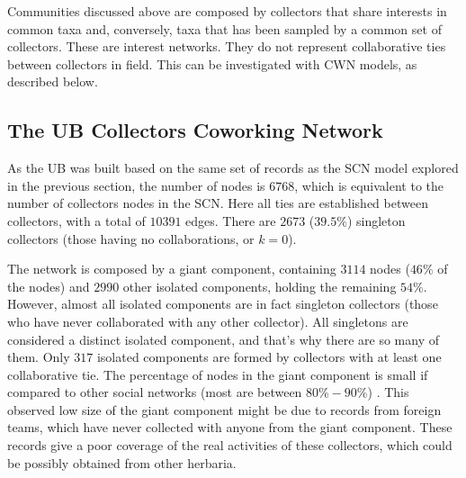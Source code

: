Communities discussed above are composed by collectors that share interests in common taxa and, conversely, taxa that has been sampled by a common set of collectors.
These are interest networks.
They do not represent collaborative ties between collectors in field.
This can be investigated with CWN models, as described below.


\subsection{The UB Collectors Coworking Network}

As the UB was built based on the same set of records as the SCN model explored in the previous section, the number of nodes is $6768$, which is equivalent to the number of collectors nodes in the SCN.
Here all ties are established between collectors, with a total of $10391$ edges.
There are $2673$ ($39.5\%$) singleton collectors (those having no collaborations, or $k=0$).

The network is composed by a giant component, containing $3114$ nodes ($46\%$ of the nodes) and $2990$ other isolated components, holding the remaining $54\%$.
However, almost all isolated components are in fact singleton collectors (those who have never collaborated with any other collector). All singletons are considered a distinct isolated component, and that's why there are so many of them. Only $317$ isolated components are formed by collectors with at least one collaborative tie.
The percentage of nodes in the giant component is small if compared to other social networks (most are between $80\% - 90\%$) \cite{Newman}. This observed low size of the giant component might be due to records from foreign teams, which have never collected with anyone from the giant component. These records give a poor coverage of the real activities of these collectors, which could be possibly obtained from other herbaria.

